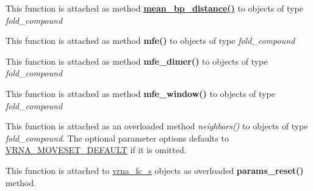 \begin{DoxyRefList}
\item[\label{wrappers__wrappers000085}%
\Hypertarget{wrappers__wrappers000085}%
Global \hyperlink{group__pf__fold_gaa6b8983b559b9ef4b2e1b31113ea317b}{vrna\+\_\+mean\+\_\+bp\+\_\+distance} (vrna\+\_\+fold\+\_\+compound\+\_\+t $\ast$vc)]This function is attached as method {\bfseries \hyperlink{group__pf__fold_ga79cbc375af65f11609feb6b055269e7d}{mean\+\_\+bp\+\_\+distance()}} to objects of type {\itshape fold\+\_\+compound}  
\item[\label{wrappers__wrappers000074}%
\Hypertarget{wrappers__wrappers000074}%
Global \hyperlink{group__mfe__fold_gabd3b147371ccf25c577f88bbbaf159fd}{vrna\+\_\+mfe} (vrna\+\_\+fold\+\_\+compound\+\_\+t $\ast$vc, char $\ast$structure)]This function is attached as method {\bfseries mfe()} to objects of type {\itshape fold\+\_\+compound}  
\item[\label{wrappers__wrappers000075}%
\Hypertarget{wrappers__wrappers000075}%
Global \hyperlink{group__mfe__cofold_gaab22d10c1190f205f16a77cab9d5d3ee}{vrna\+\_\+mfe\+\_\+dimer} (vrna\+\_\+fold\+\_\+compound\+\_\+t $\ast$vc, char $\ast$structure)]This function is attached as method {\bfseries mfe\+\_\+dimer()} to objects of type {\itshape fold\+\_\+compound}  
\item[\label{wrappers__wrappers000076}%
\Hypertarget{wrappers__wrappers000076}%
Global \hyperlink{group__local__mfe__fold_ga689df235a1915a1ad56e377383c044ce}{vrna\+\_\+mfe\+\_\+window} (vrna\+\_\+fold\+\_\+compound\+\_\+t $\ast$vc, F\+I\+LE $\ast$file)]This function is attached as method {\bfseries mfe\+\_\+window()} to objects of type {\itshape fold\+\_\+compound}  
\item[\label{wrappers__wrappers000078}%
\Hypertarget{wrappers__wrappers000078}%
Global \hyperlink{group__neighbors_gab1473d856b15da2120fe648977798ad5}{vrna\+\_\+neighbors} (vrna\+\_\+fold\+\_\+compound\+\_\+t $\ast$vc, const short $\ast$pt, unsigned int options)]This function is attached as an overloaded method {\itshape neighbors()} to objects of type {\itshape fold\+\_\+compound}. The optional parameter {\ttfamily options} defaults to \hyperlink{group__neighbors_gaa5ffec4dd0d02df320f123e6888154d1}{V\+R\+N\+A\+\_\+\+M\+O\+V\+E\+S\+E\+T\+\_\+\+D\+E\+F\+A\+U\+LT} if it is omitted.  
\item[\label{wrappers__wrappers000081}%
\Hypertarget{wrappers__wrappers000081}%
Global \hyperlink{group__energy__parameters_gac40dc82e48a72a97cfc58b9da08a7792}{vrna\+\_\+params\+\_\+reset} (vrna\+\_\+fold\+\_\+compound\+\_\+t $\ast$vc, vrna\+\_\+md\+\_\+t $\ast$md\+\_\+p)]This function is attached to \hyperlink{group__fold__compound_structvrna__fc__s}{vrna\+\_\+fc\+\_\+s} objects as overloaded {\bfseries params\+\_\+reset()} method.


\end{DoxyRefList}
